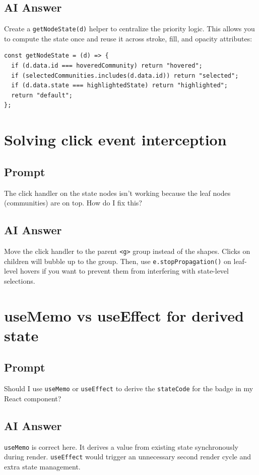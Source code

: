 \documentclass[11pt]{article}
\begin{document}
\subsection*{AI Answer}
Create a \texttt{getNodeState(d)} helper to centralize the priority logic. This allows you to compute the state once and reuse it across stroke, fill, and opacity attributes:
\begin{Verbatim}[fontsize=\small]
const getNodeState = (d) => {
  if (d.data.id === hoveredCommunity) return "hovered";
  if (selectedCommunities.includes(d.data.id)) return "selected";
  if (d.data.state === highlightedState) return "highlighted";
  return "default";
};
\end{Verbatim}

\section{Solving click event interception}
\subsection*{Prompt}
The click handler on the state nodes isn't working because the leaf nodes (communities) are on top. How do I fix this?

\subsection*{AI Answer}
Move the click handler to the parent \texttt{<g>} group instead of the shapes. Clicks on children will bubble up to the group. Then, use \texttt{e.stopPropagation()} on leaf-level hovers if you want to prevent them from interfering with state-level selections.

\section{useMemo vs useEffect for derived state}
\subsection*{Prompt}
Should I use \texttt{useMemo} or \texttt{useEffect} to derive the \texttt{stateCode} for the badge in my React component?

\subsection*{AI Answer}
\texttt{useMemo} is correct here. It derives a value from existing state synchronously during render. \texttt{useEffect} would trigger an unnecessary second render cycle and extra state management.
\end{document}
